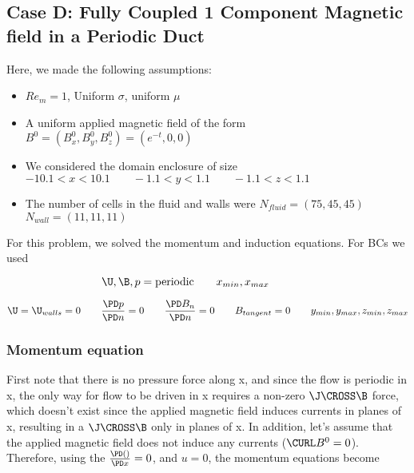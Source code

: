 \documentclass[11pt]{article}
\newcommand{\figS}{22.1em}
\newcommand{\figH}{\figS}
\newcommand{\figW}{\figS}
\begin{document}

\subsection{Case D: Fully Coupled 1 Component Magnetic field in a Periodic Duct}

Here, we made the following assumptions:

\begin{itemize}
\item $Re_m = 1$, Uniform $\sigma$, uniform $\mu$
\item A uniform applied magnetic field of the form $B^0 = (B_x^0,B_y^0,B_z^0) = (e^{-t},0,0)$
\item We considered the domain enclosure of size $-10.1 < x < 10.1 \qquad -1.1 < y < 1.1 \qquad -1.1 < z < 1.1$
\item The number of cells in the fluid and walls were $N_{fluid} = (75,45,45)$ \qquad $N_{wall} = (11,11,11)$
\end{itemize}

For this problem, we solved the momentum and induction equations. For BCs we used

\begin{equation}
	\U,
	\B,
	p = \text{periodic}
	\qquad
	x_{min},x_{max}
	\qquad \qquad
\end{equation}

\begin{equation}
	\U = \U_{walls} = 0
	\qquad
	\frac{\PD p}{\PD n} = 0
	\qquad
	\frac{\PD B_{n}}{\PD n} = 0
	\qquad
	B_{tangent} = 0
	\qquad
	y_{min},y_{max},
	z_{min},z_{max}
\end{equation}

\subsubsection{Momentum equation}

First note that there is no pressure force along x, and since the flow is periodic in x, the only way for flow to be driven in x requires a non-zero $\J \CROSS \B$ force, which doesn't exist since the applied magnetic field induces currents in planes of x, resulting in a $\J \CROSS \B$ only in planes of x. In addition, let's assume that the applied magnetic field does not induce any currents ($\CURL B^0=0$). Therefore, using the $\frac{\PD ()}{\PD x} = 0$, and $u = 0$, the momentum equations become
\end{document}
